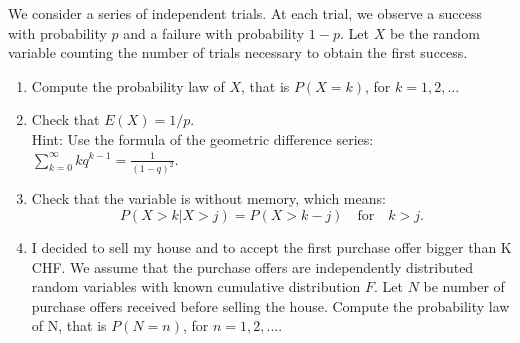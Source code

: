 \documentclass[12pt,thmsa]{article}\usepackage[]{graphicx}\usepackage[]{color}
\begin{document}
We consider a series of independent trials. At each trial, we observe a success with probability $p$ and a failure with probability $1-p$. Let $X$ be the random variable counting the number of trials necessary to
obtain the first success.
\begin{enumerate}
  \item Compute the probability law of $X$, that is $P(X=k)$, for $k=1,2,..$.
  \item Check that $E(X)=1/p$. \\
  Hint: Use the formula of the geometric difference series: $\sum_{k=0}^\infty k q^{k-1}=\frac{1}{(1-q)^2}$.
  \item Check that the variable is without memory, which means:
  \begin{equation*}
    P(X>k\vert X>j)=P(X>k-j) \quad \text{for} \quad k>j.
  \end{equation*}
  \item I decided to sell my house and to accept the first purchase offer bigger than K CHF. We assume that the purchase offers are independently distributed random variables
  with known cumulative distribution $F$. Let $N$ be number of purchase offers received before selling the house.
  Compute the probability law of N, that is $P(N=n)$, for $n=1,2,...$.
\end{enumerate}
\end{document}
